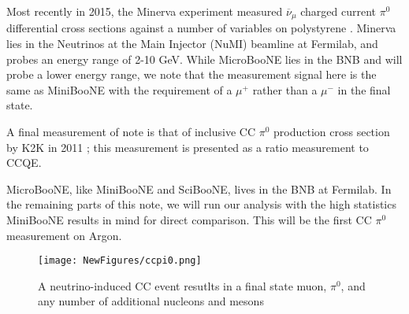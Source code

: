\documentclass[12pt]{article}
\begin{document}
\par Most recently in 2015, the Minerva experiment measured $\overline{\nu}_\mu$ charged current $\pi^0$ differential cross sections against a number of variables  on polystyrene \cite{bib:minerva_thesis} \cite{bib:minerva_paper}.  Minerva lies in the Neutrinos at the Main Injector (NuMI) beamline at Fermilab, and probes an energy range of 2-10 GeV.  While MicroBooNE lies in the BNB and will probe a lower energy range, we note that the measurement signal here is the same as MiniBooNE with the requirement of a $\mu^+$ rather than a $\mu^-$ in the final state. 
\par A final measurement of note is that of inclusive CC $\pi^0$ production cross section by K2K in 2011 \cite{bib:k2k_paper}; this measurement is presented as a ratio measurement to CCQE.  
\par MicroBooNE, like MiniBooNE and SciBooNE, lives in the BNB at Fermilab.  In the remaining parts of this note, we will run our analysis with the high statistics MiniBooNE results in mind for direct comparison.  This will be the first CC $\pi^0$ measurement on Argon.

\begin{figure}[H]
\centering
\texttt{[image: NewFigures/ccpi0.png]}
\caption{A neutrino-induced CC event resutlts in a final state muon, $\pi^0$, and any number of additional nucleons and mesons } 
\label{fig:CCNC}
\end{figure}
\end{document}
